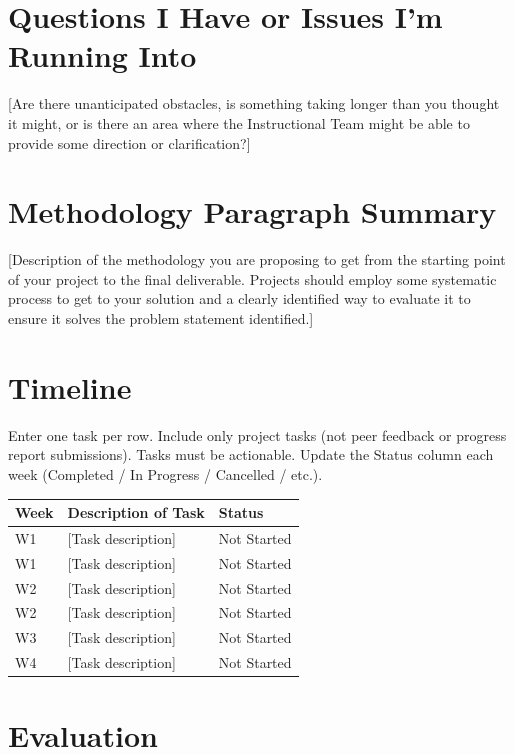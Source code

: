 \documentclass[12pt]{article}
\newcommand{\tlrow}[3]{#1 & #2 & #3 \\}
\begin{document}
\section{Questions I Have or Issues I'm Running Into}

[Are there unanticipated obstacles, is something taking longer than you
thought it might, or is there an area where the Instructional Team might be
able to provide some direction or clarification?]

\section{Methodology Paragraph Summary}

[Description of the methodology you are proposing to get from the starting
point of your project to the final deliverable. Projects should employ some
systematic process to get to your solution and a clearly identified way to
evaluate it to ensure it solves the problem statement identified.]

\section{Timeline}

{\small Enter one task per row. Include only project tasks (not peer feedback
or progress report submissions). Tasks must be actionable. Update the Status
column each week (Completed / In Progress / Cancelled / etc.).}

\vspace{0.5em}
\begin{tabularx}{\linewidth}{@{} l X l @{}}
  \toprule
  \textbf{Week} & \textbf{Description of Task} & \textbf{Status} \\
  \midrule
  \tlrow{W1}{[Task description]}{Not Started}
  \tlrow{W1}{[Task description]}{Not Started}
  \tlrow{W2}{[Task description]}{Not Started}
  \tlrow{W2}{[Task description]}{Not Started}
  \tlrow{W3}{[Task description]}{Not Started}
  \tlrow{W4}{[Task description]}{Not Started}
  \bottomrule
\end{tabularx}

\section{Evaluation}
\end{document}
